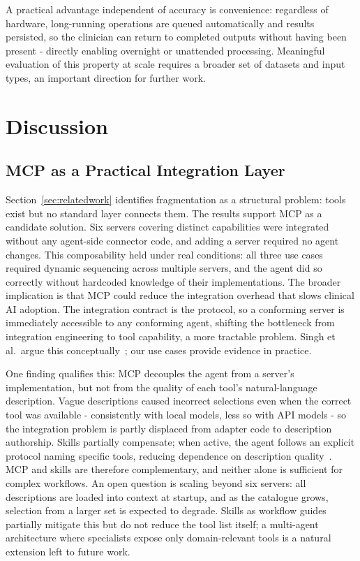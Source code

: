 \documentclass[preprint,12pt]{elsarticle}
\begin{document}
A practical advantage independent of accuracy is convenience: regardless of hardware, long-running operations are queued automatically and results persisted, so the clinician can return to completed outputs without having been present - directly enabling overnight or unattended processing. Meaningful evaluation of this property at scale requires a broader set of datasets and input types, an important direction for further work.

\section{Discussion}

\subsection{MCP as a Practical Integration Layer}
Section~\ref{sec:relatedwork} identifies fragmentation as a structural problem: tools exist but no standard layer connects them. The results support MCP as a candidate solution. Six servers covering distinct capabilities were integrated without any agent-side connector code, and adding a server required no agent changes. This composability held under real conditions: all three use cases required dynamic sequencing across multiple servers, and the agent did so correctly without hardcoded knowledge of their implementations. The broader implication is that MCP could reduce the integration overhead that slows clinical AI adoption. The integration contract is the protocol, so a conforming server is immediately accessible to any conforming agent, shifting the bottleneck from integration engineering to tool capability, a more tractable problem. Singh et al.\ argue this conceptually~\cite{mcp-aditi}; our use cases provide evidence in practice.

One finding qualifies this: MCP decouples the agent from a server's implementation, but not from the quality of each tool's natural-language description. Vague descriptions caused incorrect selections even when the correct tool was available - consistently with local models, less so with API models - so the integration problem is partly displaced from adapter code to description authorship. Skills partially compensate; when active, the agent follows an explicit protocol naming specific tools, reducing dependence on description quality~\cite{agentskillslargelanguage}. MCP and skills are therefore complementary, and neither alone is sufficient for complex workflows. An open question is scaling beyond six servers: all descriptions are loaded into context at startup, and as the catalogue grows, selection from a larger set is expected to degrade. Skills as workflow guides partially mitigate this but do not reduce the tool list itself; a multi-agent architecture where specialists expose only domain-relevant tools is a natural extension left to future work.
\end{document}
